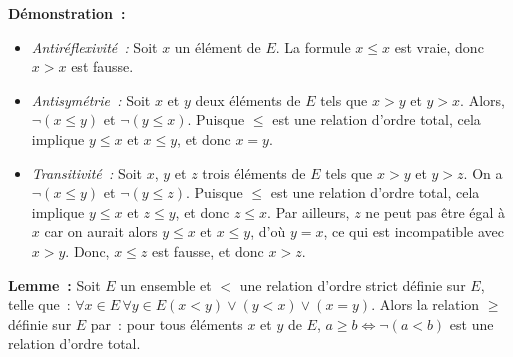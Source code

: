\noindent\textbf{Démonstration :} 
\begin{itemize}[nosep]
    \item \textit{Antiréflexivité :} Soit $x$ un élément de $E$. 
        La formule $x \leq x$ est vraie, donc $x > x$ est fausse. 
    \item \textit{Antisymétrie :} Soit $x$ et $y$ deux éléments de $E$ tels que $x > y$ et $y > x$. 
        Alors, $\neg (x \leq y)$ et $\neg (y \leq x)$. 
        Puisque $\leq$ est une relation d'ordre total, cela implique $y \leq x$ et $x \leq y$, et donc $x = y$.
    \item \textit{Transitivité :} Soit $x$, $y$ et $z$ trois éléments de $E$ tels que $x > y$ et $y > z$. 
        On a $\neg (x \leq y)$ et $\neg (y \leq z)$. 
        Puisque $\leq$ est une relation d'ordre total, cela implique $y \leq x$ et $z \leq y$, et donc $z \leq x$. 
        Par ailleurs, $z$ ne peut pas être égal à $x$ car on aurait alors $y \leq x$ et $x \leq y$, d'où $y = x$, ce qui est incompatible avec $x > y$. 
        Donc, $x \leq z$ est fausse, et donc $x > z$.
\end{itemize}

\done

\medskip

\noindent\textbf{Lemme :} Soit $E$ un ensemble et $<$ une relation d'ordre strict définie sur $E$, telle que : $\forall x \in E \, \forall y \in E (x < y) \vee (y < x) \vee (x = y)$. 
    Alors la relation $\geq$ définie sur $E$ par : pour tous éléments $x$ et $y$ de $E$, $a \geq b \Leftrightarrow \neg (a < b)$ est une relation d'ordre total. 

\medskip

